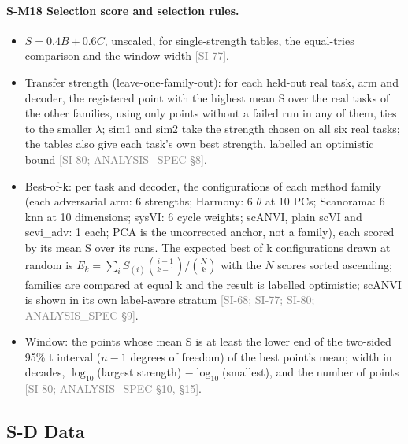 \documentclass[11pt]{article}
\newcommand{\src}[1]{{\scriptsize\textcolor{gray}{[#1]}}}
\begin{document}
\paragraph{S-M18 Selection score and selection rules.}
\begin{itemize}
\item $S = 0.4B + 0.6C$, unscaled, for single-strength tables, the equal-tries comparison and the window width \src{SI-77}.
\item Transfer strength (leave-one-family-out): for each held-out real task, arm and decoder, the registered point with the highest mean S over the real tasks of the other families, using only points without a failed run in any of them, ties to the smaller $\lambda$; sim1 and sim2 take the strength chosen on all six real tasks; the tables also give each task's own best strength, labelled an optimistic bound \src{SI-80; ANALYSIS\_SPEC \S8}.
\item Best-of-k: per task and decoder, the configurations of each method family (each adversarial arm: 6 strengths; Harmony: 6 $\theta$ at 10 PCs; Scanorama: 6 knn at 10 dimensions; sysVI: 6 cycle weights; scANVI, plain scVI and scvi\_adv: 1 each; PCA is the uncorrected anchor, not a family), each scored by its mean S over its runs. The expected best of k configurations drawn at random is $E_k = \sum_i S_{(i)} \binom{i-1}{k-1} / \binom{N}{k}$ with the $N$ scores sorted ascending; families are compared at equal k and the result is labelled optimistic; scANVI is shown in its own label-aware stratum \src{SI-68; SI-77; SI-80; ANALYSIS\_SPEC \S9}.
\item Window: the points whose mean S is at least the lower end of the two-sided 95\% t interval ($n - 1$ degrees of freedom) of the best point's mean; width in decades, $\log_{10}$(largest strength) $- \log_{10}$(smallest), and the number of points \src{SI-80; ANALYSIS\_SPEC \S10, \S15}.
\end{itemize}

\subsection*{S-D Data}
\end{document}
